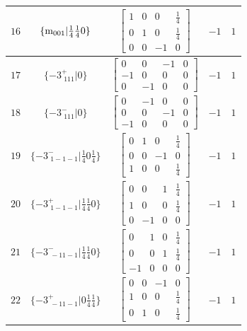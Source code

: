 \documentclass[fleqn,8pt]{jsarticle}
\begin{document}
\begin{longtable}{ccccc}
$ 16 $ & $ \{{\rm m}_{001}|\frac{1}{4} \frac{1}{4} 0\} $ & $ \begin{bmatrix} 1 & 0 & 0 & \frac{1}{4} \\ 0 & 1 & 0 & \frac{1}{4} \\ 0 & 0 & -1 & 0 \end{bmatrix} $ & $ -1 $ & $ 1 $ \\ \hline
$ 17 $ & $ \{-3^{+}_{\,\,111}|0\} $ & $ \begin{bmatrix} 0 & 0 & -1 & 0 \\ -1 & 0 & 0 & 0 \\ 0 & -1 & 0 & 0 \end{bmatrix} $ & $ -1 $ & $ 1 $ \\ \hline
$ 18 $ & $ \{-3^{-}_{\,\,111}|0\} $ & $ \begin{bmatrix} 0 & -1 & 0 & 0 \\ 0 & 0 & -1 & 0 \\ -1 & 0 & 0 & 0 \end{bmatrix} $ & $ -1 $ & $ 1 $ \\ \hline
$ 19 $ & $ \{-3^{-}_{\,\,1-1-1}|\frac{1}{4} 0 \frac{1}{4}\} $ & $ \begin{bmatrix} 0 & 1 & 0 & \frac{1}{4} \\ 0 & 0 & -1 & 0 \\ 1 & 0 & 0 & \frac{1}{4} \end{bmatrix} $ & $ -1 $ & $ 1 $ \\ \hline
$ 20 $ & $ \{-3^{+}_{\,\,1-1-1}|\frac{1}{4} \frac{1}{4} 0\} $ & $ \begin{bmatrix} 0 & 0 & 1 & \frac{1}{4} \\ 1 & 0 & 0 & \frac{1}{4} \\ 0 & -1 & 0 & 0 \end{bmatrix} $ & $ -1 $ & $ 1 $ \\ \hline
$ 21 $ & $ \{-3^{-}_{\,\,-11-1}|\frac{1}{4} \frac{1}{4} 0\} $ & $ \begin{bmatrix} 0 & 1 & 0 & \frac{1}{4} \\ 0 & 0 & 1 & \frac{1}{4} \\ -1 & 0 & 0 & 0 \end{bmatrix} $ & $ -1 $ & $ 1 $ \\ \hline
$ 22 $ & $ \{-3^{+}_{\,\,-11-1}|0 \frac{1}{4} \frac{1}{4}\} $ & $ \begin{bmatrix} 0 & 0 & -1 & 0 \\ 1 & 0 & 0 & \frac{1}{4} \\ 0 & 1 & 0 & \frac{1}{4} \end{bmatrix} $ & $ -1 $ & $ 1 $ \\ \hline

\end{longtable}
\end{document}
